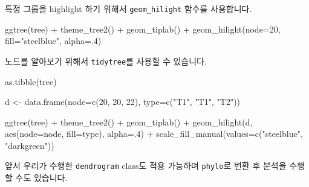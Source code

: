 \documentclass[
]{book}
\newenvironment{Shaded}{\begin{snugshade}}{\end{snugshade}}
\newcommand{\AttributeTok}[1]{\textcolor[rgb]{0.77,0.63,0.00}{#1}}
\newcommand{\DecValTok}[1]{\textcolor[rgb]{0.00,0.00,0.81}{#1}}
\newcommand{\FunctionTok}[1]{\textcolor[rgb]{0.00,0.00,0.00}{#1}}
\newcommand{\NormalTok}[1]{#1}
\newcommand{\OtherTok}[1]{\textcolor[rgb]{0.56,0.35,0.01}{#1}}
\newcommand{\SpecialCharTok}[1]{\textcolor[rgb]{0.00,0.00,0.00}{#1}}
\newcommand{\StringTok}[1]{\textcolor[rgb]{0.31,0.60,0.02}{#1}}
\begin{document}
특정 그룹을 highlight 하기 위해서 \texttt{geom\_hilight} 함수를 사용합니다.

\begin{Shaded}
\begin{Highlighting}[]

\FunctionTok{ggtree}\NormalTok{(tree) }\SpecialCharTok{+}
  \FunctionTok{theme\_tree2}\NormalTok{() }\SpecialCharTok{+}
  \FunctionTok{geom\_tiplab}\NormalTok{() }\SpecialCharTok{+}
  \FunctionTok{geom\_hilight}\NormalTok{(}\AttributeTok{node=}\DecValTok{20}\NormalTok{, }\AttributeTok{fill=}\StringTok{"steelblue"}\NormalTok{, }\AttributeTok{alpha=}\NormalTok{.}\DecValTok{4}\NormalTok{) }
\end{Highlighting}
\end{Shaded}

노드를 알아보기 위해서 \texttt{tidytree}를 사용할 수 있습니다.

\begin{Shaded}
\begin{Highlighting}[]
\FunctionTok{as.tibble}\NormalTok{(tree)}

\NormalTok{d }\OtherTok{\textless{}{-}} \FunctionTok{data.frame}\NormalTok{(}\AttributeTok{node=}\FunctionTok{c}\NormalTok{(}\DecValTok{20}\NormalTok{, }\DecValTok{20}\NormalTok{, }\DecValTok{22}\NormalTok{), }\AttributeTok{type=}\FunctionTok{c}\NormalTok{(}\StringTok{"T1"}\NormalTok{, }\StringTok{"T1"}\NormalTok{, }\StringTok{"T2"}\NormalTok{))}

\FunctionTok{ggtree}\NormalTok{(tree) }\SpecialCharTok{+}
  \FunctionTok{theme\_tree2}\NormalTok{() }\SpecialCharTok{+}
  \FunctionTok{geom\_tiplab}\NormalTok{() }\SpecialCharTok{+}
  \FunctionTok{geom\_hilight}\NormalTok{(d, }\FunctionTok{aes}\NormalTok{(}\AttributeTok{node=}\NormalTok{node, }\AttributeTok{fill=}\NormalTok{type), }\AttributeTok{alpha=}\NormalTok{.}\DecValTok{4}\NormalTok{) }\SpecialCharTok{+}
  \FunctionTok{scale\_fill\_manual}\NormalTok{(}\AttributeTok{values=}\FunctionTok{c}\NormalTok{(}\StringTok{"steelblue"}\NormalTok{, }\StringTok{"darkgreen"}\NormalTok{))}
\end{Highlighting}
\end{Shaded}

앞서 우리가 수행한 \texttt{dendrogram} class도 적용 가능하며 \texttt{phylo}로 변환 후 분석을 수행할 수도 있습니다.
\end{document}
